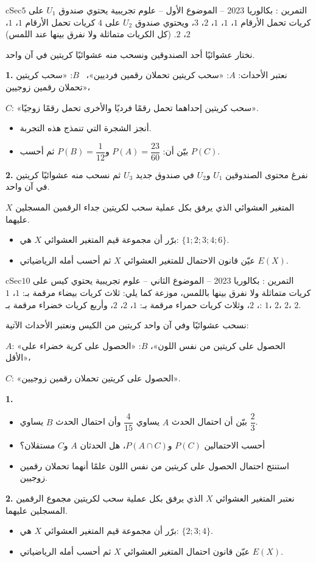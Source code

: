 \documentclass[12pt,a4paper]{article}
\newenvironment{BOX}[2]{\begin{otherlanguage}{english}\begin{arbox}{#1}{#2}}{\end{arbox}\end{otherlanguage}}
\newcounter{exo}
\newenvironment{tamrin}[1]{\stepcounter{exo}\begin{BOX}{cSec}{التمرين \theexo: #1}}{\end{BOX}}
\newenvironment{sq}{\begin{itemize}[leftmargin=2.4em,itemsep=3pt]}{\end{itemize}}
\newcommand{\qa}{\item[(أ)]}\newcommand{\qb}{\item[(ب)]}\newcommand{\qc}{\item[(جـ)]}\newcommand{\qd}{\item[(د)]}\newcommand{\qe}{\item[(هـ)]}
\newcommand{\QQ}[1]{\par\smallskip\textbf{#1.} }
\begin{document}
\begin{tamrin}{بكالوريا 2023 -- الموضوع الأول -- علوم تجريبية}
يحتوي صندوق $U_1$ على $5$ كريات تحمل الأرقام $1$، $1$، $1$، $2$، $3$، ويحتوي صندوق $U_2$ على $4$ كريات تحمل الأرقام $1$، $1$، $2$، $2$. (كل الكريات متماثلة ولا نفرق بينها عند اللمس)

نختار عشوائيًا أحد الصندوقين ونسحب منه عشوائيًا كريتين في آن واحد.
\QQ{1} نعتبر الأحداث: $A$: «سحب كريتين تحملان رقمين فرديين»، \ $B$: «سحب كريتين تحملان رقمين زوجيين»،

$C$: «سحب كريتين إحداهما تحمل رقمًا فرديًا والأخرى تحمل رقمًا زوجيًا».
\begin{sq}
\qa أنجز الشجرة التي تنمذج هذه التجربة.
\qb بيّن أن: $P(A)=\dfrac{23}{60}$ و$P(B)=\dfrac{1}{12}$ ثم أحسب $P(C)$.
\end{sq}
\QQ{2} نفرغ محتوى الصندوقين $U_1$ و$U_2$ في صندوق جديد $U_3$ ثم نسحب منه عشوائيًا كريتين في آن واحد.

$X$ المتغير العشوائي الذي يرفق بكل عملية سحب لكريتين جداء الرقمين المسجلين عليهما.
\begin{sq}
\qa برّر أن مجموعة قيم المتغير العشوائي $X$ هي: $\{1;2;3;4;6\}$.
\qb عيّن قانون الاحتمال للمتغير العشوائي $X$ ثم أحسب أمله الرياضياتي $E(X)$.
\end{sq}
\end{tamrin}

\begin{tamrin}{بكالوريا 2023 -- الموضوع الثاني -- علوم تجريبية}
يحتوي كيس على $10$ كريات متماثلة ولا نفرق بينها باللمس، موزعة كما يلي: ثلاث كريات بيضاء مرقمة بـ: $1$، $1$، $2$، وثلاث كريات حمراء مرقمة بـ: $1$، $2$، $2$، وأربع كريات خضراء مرقمة بـ: $1$، $2$، $2$، $2$.

نسحب عشوائيًا وفي آن واحد كريتين من الكيس ونعتبر الأحداث الآتية:

$A$: «الحصول على كريتين من نفس اللون»، \quad $B$: «الحصول على كرية خضراء على الأقل»،

$C$: «الحصول على كريتين تحملان رقمين زوجيين».
\QQ{1}
\begin{sq}
\qa بيّن أن احتمال الحدث $A$ يساوي $\dfrac{4}{15}$ وأن احتمال الحدث $B$ يساوي $\dfrac23$.
\qb أحسب الاحتمالين $P(C)$ و$P(A\cap C)$، هل الحدثان $A$ و$C$ مستقلان؟
\qc استنتج احتمال الحصول على كريتين من نفس اللون علمًا أنهما تحملان رقمين زوجيين.
\end{sq}
\QQ{2} نعتبر المتغير العشوائي $X$ الذي يرفق بكل عملية سحب لكريتين مجموع الرقمين المسجلين عليهما.
\begin{sq}
\qa برّر أن مجموعة قيم المتغير العشوائي $X$ هي: $\{2;3;4\}$.
\qb عيّن قانون احتمال المتغير العشوائي $X$ ثم أحسب أمله الرياضياتي $E(X)$.
\end{sq}
\end{tamrin}
\end{document}
